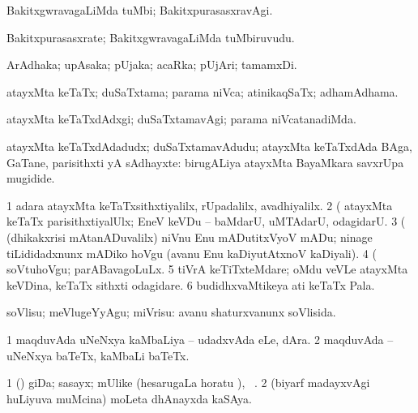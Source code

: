 \bentry
{} 
\gl{\kirxvi}
\expl{}
\bmng
BakitxgwravagaLiMda tuMbi; BakitxpurasasxravAgi. 
\emng
\eentry

\bentry
{} 
\gl{\nA}
\expl{}
\bmng
Bakitxpurasasxrate; BakitxgwravagaLiMda tuMbiruvudu. 
\emng
\eentry

\bentry
{} 
\gl{\nA}
\expl{}
\bmng
ArAdhaka; upAsaka; pUjaka; acaRka; pUjAri; tamamxDi. 
\emng
\eentry

\bentry 
{} 
\gl{\gu}
\expl{}
\bmng
atayxMta keTaTx; duSaTxtama; parama niVca; atinikaqSaTx; adhamAdhama. 
\emng
\eentry

\bentry 
{} 
\gl{\kirxvi}
\expl{}
\bmng
atayxMta keTaTxdAdxgi; duSaTxtamavAgi; parama niVcatanadiMda. 
\emng
\eentry

\bentry 
{} 
\gl{\nA}
\expl{}
\bmng
atayxMta keTaTxdAdadudx; duSaTxtamavAdudu; atayxMta keTaTxdAda BAga, GaTane, parisithxti yA sAdhayxte:  birugALiya atayxMta BayaMkara savxrUpa mugidide. 
\emng

\noindent
\gl{\pagu}
\expl{}
\bmng
\bnum
\num{1}  adara atayxMta keTaTxsithxtiyalilx, rUpadalilx, avadhiyalilx. 
\num{2}  (  atayxMta keTaTx parisithxtiyalUlx; EneV keVDu -- baMdarU, uMTAdarU, odagidarU. 
\num{3}  (  (dhikakxrisi mAtanADuvalilx) niVnu Enu mADutitxVyoV mADu; ninage tiLididadxnunx mADiko hoVgu (avanu Enu kaDiyutAtxnoV kaDiyali). 
\num{4}  (  soVtuhoVgu; parABavagoLuLx. 
\num{5}  tiVrA keTiTxteMdare; oMdu veVLe atayxMta keVDina, keTaTx sithxti odagidare. 
\num{6}  budidhxvaMtikeya ati keTaTx Pala. 
\enum
\emng
\eentry

\bentry 
{} 
\gl{\sakirx}
\expl{}
\bmng
soVlisu; meVlugeYyAgu; miVrisu:  avanu shaturxvanunx soVlisida. 
\emng
\eentry

\bentry
{} 
\gl{\nA}
\expl{}
\bmng
\bnum
\num{1} maqduvAda uNeNxya kaMbaLiya -- udadxvAda eLe, dAra. 
\num{2} maqduvAda -- uNeNxya baTeTx, kaMbaLi baTeTx. 
\enum
\emng
\eentry

\bentry
{} 
\gl{\nA}
\expl{}
\bmng
\bnum
\num{1} (\pArxparx) giDa; sasayx; mUlike (hesarugaLa horatu \viparx), \udA\ . 
\num{2} (biyarf madayxvAgi huLiyuva muMcina) moLeta dhAnayxda kaSAya. 
\enum
\emng
\eentry


